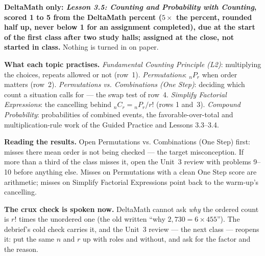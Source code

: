 \documentclass[10pt]{article}
\newcommand{\Pnr}[2]{{}_{#1}P_{#2}}
\newcommand{\Cnr}[2]{{}_{#1}C_{#2}}
\begin{document}
\begin{teachernote}[Homework]
\textbf{DeltaMath only: \emph{Lesson 3.5: Counting and Probability with Counting}, scored 1 to
5 from the DeltaMath percent ($5 \times$ the percent, rounded half up, never below 1 for an
assignment completed), due at the start of the first class after two study halls; assigned at
the close, not started in class.} Nothing is turned in on paper.

\textbf{What each topic practises.} \emph{Fundamental Counting Principle (L2)}: multiplying the
choices, repeats allowed or not (row~1). \emph{Permutations}: $\Pnr{n}{r}$ when order matters
(row~2). \emph{Permutations vs. Combinations (One Step)}: deciding which count a situation
calls for --- the swap test of row~4. \emph{Simplify Factorial Expressions}: the cancelling
behind $\Cnr{n}{r} = \Pnr{n}{r}/r!$ (rows 1 and~3). \emph{Compound Probability}: probabilities
of combined events, the favorable-over-total and multiplication-rule work of the Guided
Practice and Lessons 3.3--3.4.

\textbf{Reading the results.} Open Permutations vs. Combinations (One Step) first: misses there
mean order is not being checked --- the target misconception. If more than a third of the class
misses it, open the Unit~3 review with problems 9--10 before anything else. Misses on
Permutations with a clean One Step score are arithmetic; misses on Simplify Factorial
Expressions point back to the warm-up's cancelling.

\textbf{The crux check is spoken now.} DeltaMath cannot ask \emph{why} the ordered count is
$r!$ times the unordered one (the old written ``why $2{,}730 = 6 \times 455$''). The debrief's
cold check carries it, and the Unit~3 review --- the next class --- reopens it: put the same
$n$ and $r$ up with roles and without, and ask for the factor and the reason.
\end{teachernote}
\end{document}
